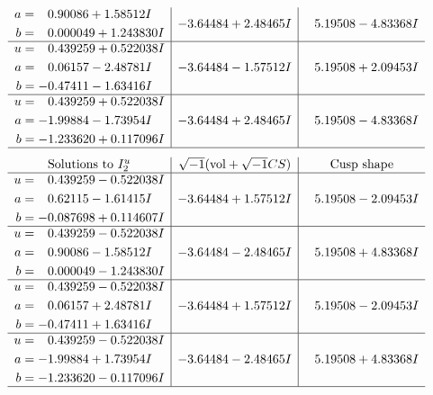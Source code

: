 \documentclass[1p]{elsarticle_modified}
\theoremstyle{definition}
\newcommand{\I}{\sqrt{-1}}
\begin{document}
$$\begin{array}{c|c|c}
\begin{aligned}
a &= \phantom{-}0.90086 + 1.58512 I \\
b &= \phantom{-}0.000049 + 1.243830 I\end{aligned}
 & -3.64484 + 2.48465 I & \phantom{-}5.19508 - 4.83368 I \\ \hline\begin{aligned}
u &= \phantom{-}0.439259 + 0.522038 I \\
a &= \phantom{-}0.06157 - 2.48781 I \\
b &= -0.47411 - 1.63416 I\end{aligned}
 & -3.64484 - 1.57512 I & \phantom{-}5.19508 + 2.09453 I \\ \hline\begin{aligned}
u &= \phantom{-}0.439259 + 0.522038 I \\
a &= -1.99884 - 1.73954 I \\
b &= -1.233620 + 0.117096 I\end{aligned}
 & -3.64484 + 2.48465 I & \phantom{-}5.19508 - 4.83368 I\\
 \hline 
 \end{array}$$\newpage$$\begin{array}{c|c|c}  
\text{Solutions to }I^u_{2}& \I (\text{vol} + \sqrt{-1}CS) & \text{Cusp shape}\\
 \hline 
\begin{aligned}
u &= \phantom{-}0.439259 - 0.522038 I \\
a &= \phantom{-}0.62115 - 1.61415 I \\
b &= -0.087698 + 0.114607 I\end{aligned}
 & -3.64484 + 1.57512 I & \phantom{-}5.19508 - 2.09453 I \\ \hline\begin{aligned}
u &= \phantom{-}0.439259 - 0.522038 I \\
a &= \phantom{-}0.90086 - 1.58512 I \\
b &= \phantom{-}0.000049 - 1.243830 I\end{aligned}
 & -3.64484 - 2.48465 I & \phantom{-}5.19508 + 4.83368 I \\ \hline\begin{aligned}
u &= \phantom{-}0.439259 - 0.522038 I \\
a &= \phantom{-}0.06157 + 2.48781 I \\
b &= -0.47411 + 1.63416 I\end{aligned}
 & -3.64484 + 1.57512 I & \phantom{-}5.19508 - 2.09453 I \\ \hline\begin{aligned}
u &= \phantom{-}0.439259 - 0.522038 I \\
a &= -1.99884 + 1.73954 I \\
b &= -1.233620 - 0.117096 I\end{aligned}
 & -3.64484 - 2.48465 I & \phantom{-}5.19508 + 4.83368 I\\
 \hline 
 \end{array}$$\newpage\newpage\renewcommand{\arraystretch}{1}
\end{document}
